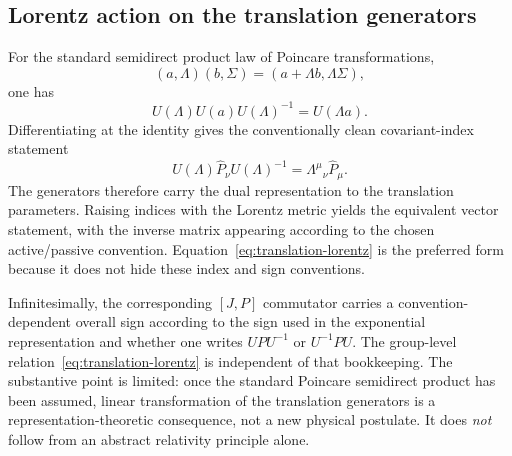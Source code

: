 \documentclass[11pt,a4paper]{article}
\begin{document}
\subsection{Lorentz action on the translation generators}
For the standard semidirect product law of Poincare transformations,
\begin{equation}
(a,\Lambda)(b,\Sigma)=(a+\Lambda b,\Lambda\Sigma),
\end{equation}
one has
\begin{equation}
U(\Lambda)U(a)U(\Lambda)^{-1}=U(\Lambda a).
\end{equation}
Differentiating at the identity gives the conventionally clean covariant-index statement
\begin{equation}
\boxed{
U(\Lambda)\hat P_\nu U(\Lambda)^{-1}
=\Lambda^\mu{}_{\nu}\hat P_\mu .}
\label{eq:translation-lorentz}
\end{equation}
The generators therefore carry the dual representation to the translation parameters.  Raising indices with the Lorentz metric yields the equivalent vector statement, with the inverse matrix appearing according to the chosen active/passive convention.  Equation~\eqref{eq:translation-lorentz} is the preferred form because it does not hide these index and sign conventions.

Infinitesimally, the corresponding $[J,P]$ commutator carries a convention-dependent overall sign according to the sign used in the exponential representation and whether one writes $UPU^{-1}$ or $U^{-1}PU$.  The group-level relation~\eqref{eq:translation-lorentz} is independent of that bookkeeping.  The substantive point is limited: once the standard Poincare semidirect product has been assumed, linear transformation of the translation generators is a representation-theoretic consequence, not a new physical postulate.  It does \emph{not} follow from an abstract relativity principle alone.
\end{document}
